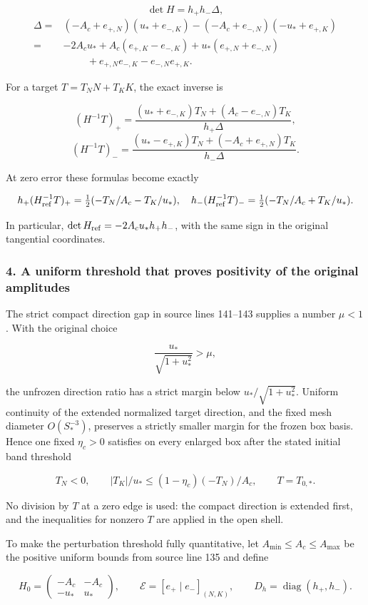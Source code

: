 \documentclass[10pt,a4paper]{article}
\begin{document}
\[
\det H=h_+h_-\Delta,
\] \[
\begin{aligned}
\Delta={}&(-A_c+e_{+,N})(u_*+e_{-,K})
-(-A_c+e_{-,N})(-u_*+e_{+,K})\\
={}&-2A_cu_*+A_c(e_{+,K}-e_{-,K})
+u_*(e_{+,N}+e_{-,N})\\
&\hspace{1cm}+e_{+,N}e_{-,K}-e_{-,N}e_{+,K}.
\end{aligned}
\]

For a target \(T=T_NN+T_KK\), the exact inverse is

\[
(H^{-1}T)_+=\frac{(u_*+e_{-,K})T_N+(A_c-e_{-,N})T_K}{h_+\Delta},
\] \[
(H^{-1}T)_-=\frac{(u_*-e_{+,K})T_N+(-A_c+e_{+,N})T_K}{h_-\Delta}.
\]

At zero error these formulas become exactly

\[
h_+(H_{\rm ref}^{-1}T)_+=\tfrac12(-T_N/A_c-T_K/u_*),
\quad
h_-(H_{\rm ref}^{-1}T)_-=\tfrac12(-T_N/A_c+T_K/u_*).
\]

In particular, \(\det H_{\rm ref}=-2A_cu_*h_+h_-\), with the same sign in the original tangential coordinates.

\subsubsection{4. A uniform threshold that proves positivity of the original amplitudes}

The strict compact direction gap in source lines 141--143 supplies a number \(\mu<1\). With the original choice

\[
\frac{u_*}{\sqrt{1+u_*^2}}>\mu,
\]

the unfrozen direction ratio has a strict margin below \(u_*/\sqrt{1+u_*^2}\). Uniform continuity of the extended normalized target direction, and the fixed mesh diameter \(O(S_*^{-3})\), preserves a strictly smaller margin for the frozen box basis. Hence one fixed \(\eta_c>0\) satisfies on every enlarged box after the stated initial band threshold

\[
T_N<0,\qquad |T_K|/u_*\le(1-\eta_c)(-T_N)/A_c,
\qquad T=T_{0,*}.
\]

No division by \(T\) at a zero edge is used: the compact direction is extended first, and the inequalities for nonzero \(T\) are applied in the open shell.

To make the perturbation threshold fully quantitative, let \(A_{\min}\le A_c\le A_{\max}\) be the positive uniform bounds from source line 135 and define

\[
H_0=\begin{pmatrix}-A_c&-A_c\\-u_*&u_*\end{pmatrix},
\qquad \mathcal E=[e_+\mid e_-]_{(N,K)},
\qquad D_h=\operatorname{diag}(h_+,h_-).
\]
\end{document}
